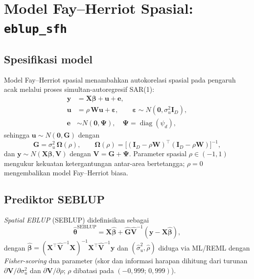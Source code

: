 \documentclass[11pt,a4paper]{article}
\theoremstyle{definition}
\begin{document}
\section{Model Fay--Herriot Spasial: \texttt{eblup\_sfh}}

\subsection{Spesifikasi model}

Model Fay--Herriot spasial \cite{pratesi2008} menambahkan autokorelasi spasial pada
pengaruh acak melalui proses simultan-autoregresif SAR(1):
\begin{subequations}
\begin{align}
  \mathbf{y} &= \mathbf{X}\boldsymbol{\beta} + \mathbf{u} + \mathbf{e}, \\
  \mathbf{u} &= \rho\,\mathbf{W}\mathbf{u} + \boldsymbol{\varepsilon},
      \qquad \boldsymbol{\varepsilon} \sim N(\mathbf{0}, \sigma_u^2 \mathbf{I}_D), \\
  \mathbf{e} &\sim N(\mathbf{0}, \boldsymbol{\Psi}), \quad
      \boldsymbol{\Psi} = \operatorname{diag}(\psi_d),
\end{align}
\end{subequations}
sehingga $\mathbf{u} \sim N(\mathbf{0}, \mathbf{G})$ dengan
\begin{equation}
  \mathbf{G} = \sigma_u^2\,\boldsymbol{\Omega}(\rho),
  \qquad
  \boldsymbol{\Omega}(\rho) =
  \bigl[(\mathbf{I}_D - \rho\mathbf{W})^{\top}(\mathbf{I}_D - \rho\mathbf{W})\bigr]^{-1},
  \label{eq:sfh-G}
\end{equation}
dan $\mathbf{y} \sim N(\mathbf{X}\boldsymbol{\beta}, \mathbf{V})$ dengan
$\mathbf{V} = \mathbf{G} + \boldsymbol{\Psi}$.
Parameter spasial $\rho \in (-1,1)$ mengukur kekuatan ketergantungan antar-area
bertetangga; $\rho = 0$ mengembalikan model Fay--Herriot biasa.

\subsection{Prediktor SEBLUP}

\emph{Spatial EBLUP} (SEBLUP) didefinisikan sebagai
\begin{equation}
  \hat{\boldsymbol{\theta}}^{\mathrm{SEBLUP}}
  = \mathbf{X}\hat{\boldsymbol{\beta}} +
    \hat{\mathbf{G}}\hat{\mathbf{V}}^{-1}(\mathbf{y} - \mathbf{X}\hat{\boldsymbol{\beta}}),
  \label{eq:seblup}
\end{equation}
dengan $\hat{\boldsymbol{\beta}} =
(\mathbf{X}^{\top}\hat{\mathbf{V}}^{-1}\mathbf{X})^{-1}
 \mathbf{X}^{\top}\hat{\mathbf{V}}^{-1}\mathbf{y}$ dan
$(\hat{\sigma}_u^2, \hat{\rho})$ diduga via ML/REML dengan \emph{Fisher-scoring}
dua parameter (skor dan informasi harapan dihitung dari turunan
$\partial\mathbf{V}/\partial\sigma_u^2$ dan $\partial\mathbf{V}/\partial\rho$;
$\rho$ dibatasi pada $(-0{,}999;\, 0{,}999)$).
\end{document}

